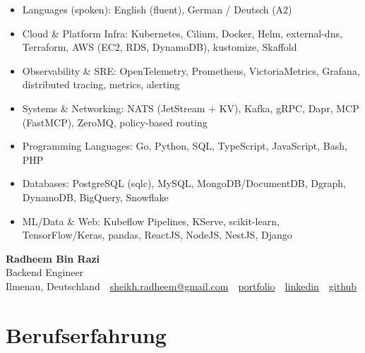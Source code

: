 \documentclass[10pt,a4paper]{resume}
\makeatletter
\newcommand{\Portfolio}{https://radheem.github.io/my-cv}
\newcommand{\PortfolioText}{portfolio}
\newcommand{\GitHub}{https://github.com/radheem}
\newcommand{\LinkedIn}{https://www.linkedin.com/in/radheem-razi}
\newcommand{\Email}{sheikh.radheem@gmail.com}
\makeatother
\begin{document}
\begin{itemize}[leftmargin=1.4em,nosep,topsep=2pt]
  \item Languages (spoken): English (fluent), German / Deutsch (A2)
  \item Cloud \& Platform Infra: Kubernetes, Cilium, Docker, Helm, external-dns, Terraform, AWS (EC2, RDS, DynamoDB), kustomize, Skaffold
  \item Observability \& SRE: OpenTelemetry, Prometheus, VictoriaMetrics, Grafana, distributed tracing, metrics, alerting
  \item Systems \& Networking: NATS (JetStream + KV), Kafka, gRPC, Dapr, MCP (FastMCP), ZeroMQ, policy-based routing
  \item Programming Languages: Go, Python, SQL, TypeScript, JavaScript, Bash, PHP
  \item Databases: PostgreSQL (sqlc), MySQL, MongoDB/DocumentDB, Dgraph, DynamoDB, BigQuery, Snowflake
  \item ML/Data \& Web: Kubeflow Pipelines, KServe, scikit-learn, TensorFlow/Keras, pandas, ReactJS, NodeJS, NestJS, Django
\end{itemize}

\clearpage
{}

\begin{center}
  {\huge\bfseries Radheem Bin Razi}\\[3pt]
  {\large Backend Engineer}\\[6pt]
  \small
  Ilmenau, Deutschland \,\textbar\,
  \href{mailto:\Email}{\Email} \,\textbar\,
  \href{\Portfolio}{\PortfolioText} \,\textbar\,
  \href{\LinkedIn}{linkedin} \,\textbar\,
  \href{\GitHub}{github}
\end{center}
\vspace{2pt}

\section{Berufserfahrung}
\end{document}
